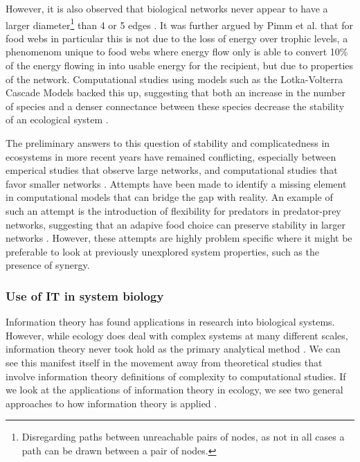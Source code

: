 \documentclass[../main.tex]{subfiles}
\begin{document}
However, it is also observed that biological networks never appear to have a larger diameter\footnote{Disregarding paths between unreachable pairs of nodes, as not in all cases a path can be drawn between a pair of nodes.} than 4 or 5 edges \cite{pimm1977number}.
It was further argued by Pimm et al. that for food webs in particular this is not due to the loss of energy over trophic levels, a phenomenom unique to food webs where energy flow only is able to convert 10\% of the energy flowing in into usable energy for the recipient, but due to properties of the network.
Computational studies using models such as the Lotka-Volterra Cascade Models backed this up, suggesting that both an increase in the number of species and a denser connectance between these species decrease the stability of an ecological system \cite{chen2001global}.

The preliminary answers to this question of stability and complicatedness in ecosystems in more recent years have remained conflicting, especially between emperical studies that observe large networks, and computational studies that favor smaller networks \cite{pimm1984complexity}.
Attempts have been made to identify a missing element in computational models that can bridge the gap with reality.
An example of such an attempt is the introduction of flexibility for predators in predator-prey networks, suggesting that an adapive food choice can preserve stability in larger networks \cite{kondoh2003foraging}.
However, these attempts are highly problem specific where it might be preferable to look at previously unexplored system properties, such as the presence of synergy. %

\subsubsection{Use of IT in system biology}

Information theory has found applications in research into biological systems.
However, while ecology does deal with complex systems at many different scales, information theory never took hold as the primary analytical method \cite{ulanowicz2001information}. %
We can see this manifest itself in the movement away from theoretical studies that involve information theory definitions of complexity to computational studies.
If we look at the applications of information theory in ecology, we see two general approaches to how information theory is applied \cite{ulanowicz2001information}.
\end{document}
